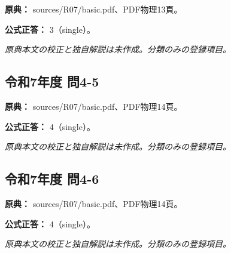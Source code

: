 \noindent\textbf{原典：} sources/R07/basic.pdf、PDF物理13頁。

\textbf{公式正答：} 3（single）。

\par\textit{原典本文の校正と独自解説は未作成。分類のみの登録項目。}

\subsection{令和7年度 問4-5}
\label{q:r07-reg-basic-4-5}

\noindent\textbf{原典：} sources/R07/basic.pdf、PDF物理14頁。

\textbf{公式正答：} 4（single）。

\par\textit{原典本文の校正と独自解説は未作成。分類のみの登録項目。}

\subsection{令和7年度 問4-6}
\label{q:r07-reg-basic-4-6}

\noindent\textbf{原典：} sources/R07/basic.pdf、PDF物理14頁。

\textbf{公式正答：} 4（single）。

\par\textit{原典本文の校正と独自解説は未作成。分類のみの登録項目。}

